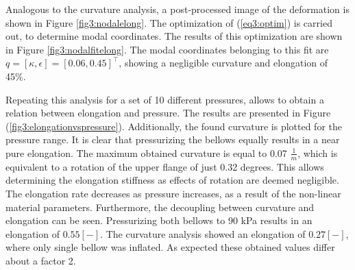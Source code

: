 Analogous to the curvature analysis, a post-processed image of the deformation is shown in Figure \ref{fig3:nodalelong}. The optimization of (\ref{eq3:optim}) is carried out, to determine modal coordinates. The results of this optimization are shown in Figure \ref{fig3:nodalfitelong}. The modal coordinates belonging to this fit are $q = [\kappa,\epsilon] = [0.06, 0.45]^\top$, showing a negligible curvature and elongation of 45\%. 

Repeating this analysis for a set of 10 different pressures, allows to obtain a relation between elongation and pressure. The results are presented in Figure (\ref{fig3:elongationvspressure}). Additionally, the found curvature is plotted for the pressure range. It is clear that pressurizing the bellows equally results in a near pure elongation. The maximum obtained curvature is equal to 0.07 $\frac{1}{m}$, which is equivalent to a rotation of the upper flange of just 0.32 degrees. This allows determining the elongation stiffness as effects of rotation are deemed negligible. The elongation rate decreases as pressure increases, as a result of the non-linear material parameters. Furthermore, the decoupling between curvature and elongation can be seen. Pressurizing both bellows to 90 kPa results in an elongation of $0.55 [-]$. The curvature analysis showed an elongation of $0.27 [-]$, where only single bellow was inflated. As expected these obtained values differ about a factor 2. 



